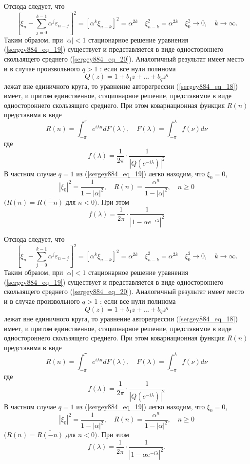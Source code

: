 Отсюда следует, что
$$
\left[\xi_n-\sum_{j=0}^{k-1} \alpha^j \varepsilon_{n-j}\right]^2=\left[\alpha^k \xi_{n-k}\right]^2=\alpha^{2 k} \quad \xi_{n-k}^2=\alpha^{2 k} \quad \xi_0^2 \rightarrow 0, \quad k \rightarrow \infty .
$$
Таким образом, при $|\alpha|<1$ стационарное решение уравнения (\ref{sergey884_eq_19}) существует и представляется в виде одностороннего скользящего среднего (\ref{sergey884_eq_20}).
Аналогичный результат имеет место и в случае произвольного $q>1$ : если все нули полинома
\begin{equation}\label{sergey884_eq_21}
Q(z)=1+b_1 z+\ldots+b_q z^q
\end{equation}
лежат вне единичного круга, то уравнение авторегрессии (\ref{sergey884_eq_18}) имеет, и притом единственное, стационарное решение, представимое в виде одностороннего скользящего среднего. При этом ковариационная функция $R(n)$ представима в виде
\begin{equation}\label{sergey884_eq_22}
R(n)=\int_{-\pi}^\pi e^{i \lambda n} d F(\lambda), \quad F(\lambda)=\int_{-\pi}^\lambda f(\nu) d \nu
\end{equation}
где
\begin{equation}\label{sergey884_eq_23}
f(\lambda)=\frac{1}{2 \pi} \cdot \frac{1}{\left|Q\left(e^{-i \lambda}\right)\right|^2}
\end{equation}
В частном случае $q=1$ из (\ref{sergey884_eq_19}) легко находим, что $\xi_0=0$,
$$
\left|\xi_0\right|^2=\frac{1}{1-|\alpha|^2}, \quad R(n)=\frac{\alpha^n}{1-|\alpha|^2}, \quad n \geqslant 0
$$
$(R(n)=\overline{R(-n)}$ для $n<0)$. При этом
$$
f(\lambda)=\frac{1}{2 \pi} \cdot \frac{1}{\left|1-\alpha e^{-i \lambda}\right|^2}
$$

Отсюда следует, что
$$
\left[\xi_n-\sum_{j=0}^{k-1} \alpha^j \varepsilon_{n-j}\right]^2=\left[\alpha^k \xi_{n-k}\right]^2=\alpha^{2 k} \quad \xi_{n-k}^2=\alpha^{2 k} \quad \xi_0^2 \rightarrow 0, \quad k \rightarrow \infty .
$$
Таким образом, при $|\alpha|<1$ стационарное решение уравнения (\ref{sergey884_eq_19}) существует и представляется в виде одностороннего скользящего среднего (\ref{sergey884_eq_20}).
Аналогичный результат имеет место и в случае произвольного $q>1$ : если все нули полинома
$$
Q(z)=1+b_1 z+\ldots+b_q z^q
$$
лежат вне единичного круга, то уравнение авторегрессии (\ref{sergey884_eq_18}) имеет, и притом единственное, стационарное решение, представимое в виде одностороннего скользящего среднего. При этом ковариационная функция $R(n)$ представима в виде
$$
R(n)=\int_{-\pi}^\pi e^{i \lambda n} d F(\lambda), \quad F(\lambda)=\int_{-\pi}^\lambda f(\nu) d \nu
$$
где
$$
f(\lambda)=\frac{1}{2 \pi} \cdot \frac{1}{\left|Q\left(e^{-i \lambda}\right)\right|^2}
$$
В частном случае $q=1$ из (\ref{sergey884_eq_19}) легко находим, что $\xi_0=0$,
$$
\left|\xi_0\right|^2=\frac{1}{1-|\alpha|^2}, \quad R(n)=\frac{\alpha^n}{1-|\alpha|^2}, \quad n \geqslant 0
$$
$(R(n)=\overline{R(-n)}$ для $n<0)$. При этом
$$
f(\lambda)=\frac{1}{2 \pi} \cdot \frac{1}{ \left| 1 - \alpha e^{-i\lambda} \right|^2 } .
$$\newline

